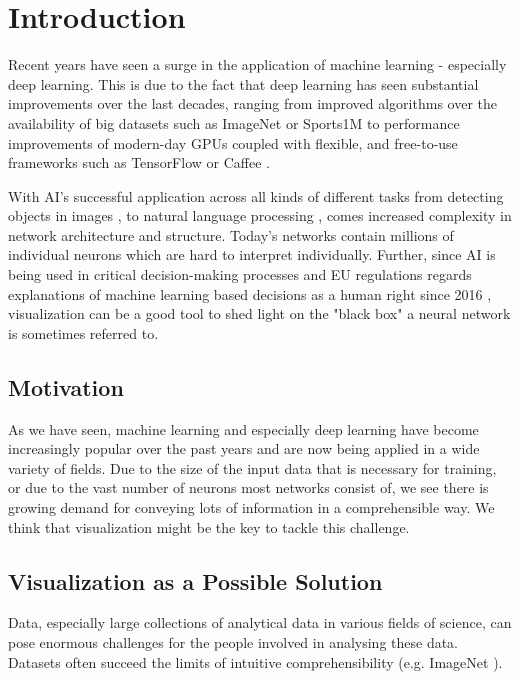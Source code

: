 \documentclass{acmsiggraph}               %
\begin{document}
\keywordlist

\section{Introduction}
Recent years have seen a surge in the application of machine learning - especially deep learning. This is due to the fact that deep learning has seen substantial improvements over the last decades, ranging from improved algorithms \cite{LeCun1998} over the availability of big datasets such as ImageNet \cite{Deng2009} or Sports1M \cite{Karpathy} to performance improvements of modern-day GPUs coupled with flexible, and free-to-use frameworks such as TensorFlow \cite{Abadi2016} or Caffee \cite{Jia2014}.

With AI's successful application across all kinds of different tasks from detecting objects in images \cite{He2015}, to natural language processing \cite{Cho}, comes increased complexity in network architecture and structure. Today's networks contain millions of individual neurons which are hard to interpret individually. Further, since AI is being used in critical decision-making processes and EU regulations regards explanations of machine learning based decisions as a human right since 2016 \cite{Choo2018}, visualization can be a good tool to shed light on the "black box" a neural network is sometimes referred to. \cite{Shwartz-Ziv2017}


\copyrightspace

\subsection{Motivation}
As we have seen, machine learning and especially deep learning have become increasingly popular over the past years and are now being applied in a wide variety of fields. Due to the size of the input data that is necessary for training, or due to the vast number of neurons most networks consist of, we see there is growing demand for conveying lots of information in a comprehensible way. We think that visualization might be the key to tackle this challenge.

\subsection{Visualization as a Possible Solution}
Data, especially large collections of analytical data in various fields of science, can pose enormous challenges for the people involved in analysing these data. Datasets often succeed the limits of intuitive comprehensibility (e.g. ImageNet \cite{Deng2009}).
\end{document}
